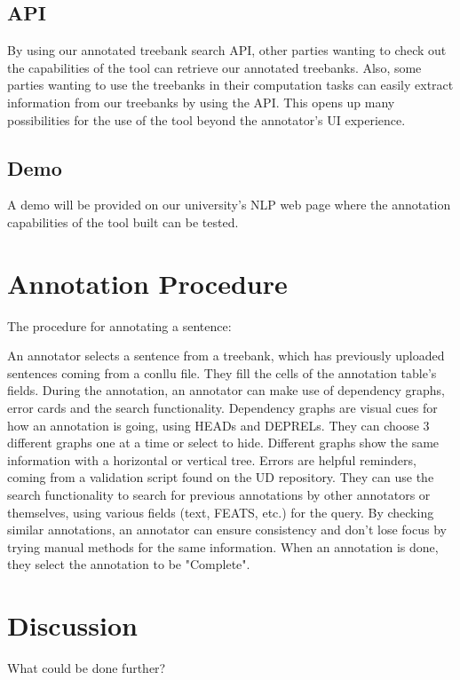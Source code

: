 \documentclass[
]{ceurart}
\begin{document}
\subsection{API}

By using our annotated treebank search API, other parties wanting to check out the capabilities of the tool can retrieve our annotated treebanks.
Also, some parties wanting to use the treebanks in their computation tasks can easily extract information from our treebanks by using the API.
This opens up many possibilities for the use of the tool beyond the annotator's UI experience.

\subsection{Demo}

A demo will be provided on our university's NLP web page where the annotation capabilities of the tool built can be tested.

\section{Annotation Procedure}
The procedure for annotating a sentence:

An annotator selects a sentence from a treebank, which has previously uploaded sentences coming from a conllu file.
They fill the cells of the annotation table's fields.
During the annotation, an annotator can make use of dependency graphs, error cards and the search functionality.
Dependency graphs are visual cues for how an annotation is going, using HEADs and DEPRELs.
They can choose 3 different graphs one at a time or select to hide.
Different graphs show the same information with a horizontal or vertical tree.
Errors are helpful reminders, coming from a validation script found on the UD repository.
They can use the search functionality to search for previous annotations by other annotators or themselves, using various fields (text, FEATS, etc.) for the query.
By checking similar annotations, an annotator can ensure consistency and don't lose focus by trying manual methods for the same information.
When an annotation is done, they select the annotation to be "Complete".

\section{Discussion}

What could be done further?


\end{document}
